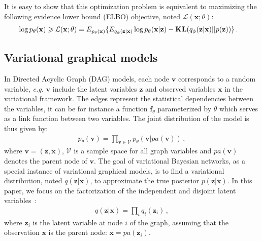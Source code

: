 \documentclass{article} %
\newcommand{\belhal}[1]{{\color{red}{\bf\sf [BK: #1]}}}
\begin{document}
It is easy to show that this optimization problem is equivalent to maximizing the following evidence lower bound (ELBO) objective, noted $\mathcal{L}(\mathbf{x}; \theta)$: 
\begin{align}\label{eq:vi_elbo}
    \log p_\theta(\mathbf{x}) \geqslant \mathcal{L}(\mathbf{x}; \theta) &= E_{p_\theta(\mathbf{x})} 
     \{E_{q_\phi(\mathbf{z}|\mathbf{x})} \log p_\theta(\mathbf{x}|\mathbf{z})  - \textbf{\text{KL}}(q_\phi(\mathbf{z}|\mathbf{x})||p(\mathbf{z}))\} \, .
\end{align}


\subsection{Variational graphical models}
In Directed Acyclic Graph (DAG) models, each node $\mathbf{v}$ corresponds to a random variable, \textit{e.g.} $\mathbf{v}$ include the latent variables $\mathbf{z}$ and observed variables $\mathbf{x}$ in the variational framework. 
The edges represent the statistical dependencies between the variables, it can be for instance a function $\mathbf{f}_\theta$ parameterized by $\theta$ which serves as a link function between two variables.  
The joint distribution of the model is thus given by:
\begin{align}
    p_\theta(\mathbf{v}) = \prod_{\mathbf{v} \in \mathcal{V}} p_\theta(\mathbf{v}|pa(\mathbf{v})) \, , 
\end{align}
where $\mathbf{v}=(\mathbf{z}, \mathbf{x})$, $\mathcal{V}$ is a sample space for all graph variables and $pa(\mathbf{v})$ denotes the parent node of $\mathbf{v}$. 
The goal of variational Bayesian networks, as a special instance of variational graphical models, is to find a variational distribution, noted $q(\mathbf{z}|\mathbf{x})$, to approximate the true posterior $p(\mathbf{z}|\mathbf{x})$. In this paper, we focus on the factorization of the independent and disjoint latent variables~\citep{bishop2003vibes}:
\begin{align}
    q(\mathbf{z}|\mathbf{x}) = \prod_i q_i(\mathbf{z}_i)\, ,
\end{align}
where $\mathbf{z}_i$ is the latent variable at node $i$ of the graph, assuming that the observation $\mathbf{x}$ is the parent node: $\mathbf{x}=pa(\mathbf{z}_i)$. 
\end{document}
